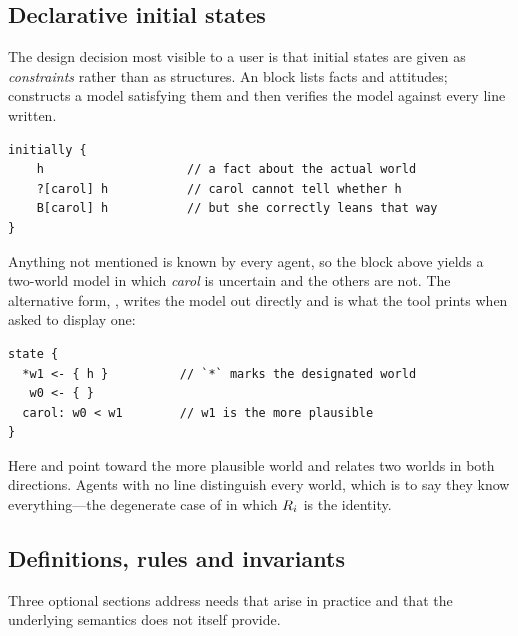 \documentclass[11pt,a4paper]{article}
\begin{document}
\subsection{Declarative initial states}
\label{sec:initially}

The design decision most visible to a user is that initial states are given as
\emph{constraints} rather than as structures. An  block lists facts and
attitudes; \delhi{} constructs a model satisfying them and then verifies the model against
every line written.

\begin{lstlisting}
initially {
    h                    // a fact about the actual world
    ?[carol] h           // carol cannot tell whether h
    B[carol] h           // but she correctly leans that way
}
\end{lstlisting}

Anything not mentioned is known by every agent, so the block above yields a two-world model in
which \emph{carol} is uncertain and the others are not. The alternative form, ,
writes the model out directly and is what the tool prints when asked to display one:

\begin{keepit}
\begin{lstlisting}
state {
  *w1 <- { h }          // `*` marks the designated world
   w0 <- { }
  carol: w0 < w1        // w1 is the more plausible
}
\end{lstlisting}
\end{keepit}

Here \code{<} and \code{<=} point toward the more plausible world and
\code{\textasciitilde} relates two
worlds in both directions. Agents with no line distinguish every world, which is to say they
know everything---the degenerate case of  in which $R_{i}$ is the identity.

\subsection{Definitions, rules and invariants}

Three optional sections address needs that arise in practice and that the underlying
semantics does not itself provide.
\end{document}
